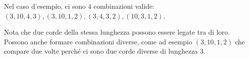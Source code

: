 
\Examples

\begin{example}
\end{example}


\Explanation

Nel caso d'esempio, ci sono $4$ combinazioni valide: $(3, 10, 4, 3), (3, 10, 1, 2), (3, 4, 3, 2), (10, 3, 1, 2)$.

Nota che due corde della stessa lunghezza possono essere legate tra di loro. Possono anche formare combinazioni diverse,
come ad esempio $(3, 10, 1, 2)$ che compare due volte perché ci sono due corde diverse di lunghezza 3.